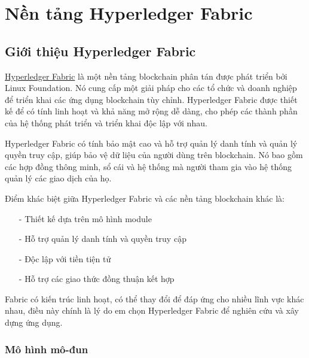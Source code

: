 \chapter{ Nền tảng Hyperledger Fabric}
\label{chap:hyper}
\section{Giới thiệu Hyperledger Fabric }
\href{https://www.hyperledger.org/use/fabric}{Hyperledger Fabric} là một nền tảng blockchain phân tán được phát triển bởi Linux Foundation. Nó 
cung cấp một giải pháp cho các tổ chức và doanh nghiệp để triển khai các ứng dụng blockchain 
tùy chỉnh. Hyperledger Fabric được thiết kế để có tính linh hoạt và khả năng mở rộng dễ dàng, 
cho phép các thành phần của hệ thống phát triển và triển khai độc lập với nhau.

Hyperledger Fabric có tính bảo mật cao và hỗ trợ quản lý danh tính và quản lý quyền truy cập, 
giúp bảo vệ dữ liệu của người dùng trên blockchain. Nó bao gồm các hợp đồng thông minh, sổ cái và
hệ thống mà người tham gia vào hệ thống quản lý các giao dịch của họ.


Điểm khác biệt giữa Hyperledger Fabric và các nền tảng blockchain khác là:
\begin{itemize}
    \item[-] Thiết kế dựa trên mô hình module 
    \item[-] Hỗ trợ quản lý danh tính và quyền truy cập
    \item[-] Độc lập với tiền tiện tử
    \item[-] Hỗ trợ các giao thức đồng thuận kết hợp
\end{itemize}

Fabric có kiến trúc linh hoạt, có thể thay đổi để đáp ứng cho nhiều lĩnh vực khác nhau, 
điều này chính là lý do em chọn Hyperledger Fabric để nghiên cứu và xây dựng ứng dụng.
\subsection{Mô hình mô-đun}

